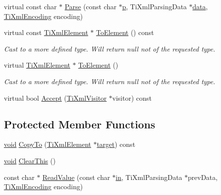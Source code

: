 \begin{DoxyCompactItemize}
\item 
virtual const char $\ast$ \hyperlink{class_ti_xml_element_a697f51bbfff55b7e371c20278087c223}{Parse} (const char $\ast$\hyperlink{glew_8h_aa5367c14d90f462230c2611b81b41d23}{p}, Ti\-Xml\-Parsing\-Data $\ast$\hyperlink{fmod__codec_8h_a42c2b1d86fa71a425e73a882cb0a72c8}{data}, \hyperlink{tinyxml_8h_a88d51847a13ee0f4b4d320d03d2c4d96}{Ti\-Xml\-Encoding} encoding)
\item 
virtual const \hyperlink{class_ti_xml_element}{Ti\-Xml\-Element} $\ast$ \hyperlink{class_ti_xml_element_ac5b8d0e25fa23fd9acbb6d146082901c}{To\-Element} () const 
\begin{DoxyCompactList}\small\item\em Cast to a more defined type. Will return null not of the requested type. \end{DoxyCompactList}\item 
virtual \hyperlink{class_ti_xml_element}{Ti\-Xml\-Element} $\ast$ \hyperlink{class_ti_xml_element_a9def86337ea7a755eb41cac980f60c7a}{To\-Element} ()
\begin{DoxyCompactList}\small\item\em Cast to a more defined type. Will return null not of the requested type. \end{DoxyCompactList}\item 
virtual bool \hyperlink{class_ti_xml_element_a71a81b2afb0d42be1543d1c404dee6f5}{Accept} (\hyperlink{class_ti_xml_visitor}{Ti\-Xml\-Visitor} $\ast$visitor) const 
\end{DoxyCompactItemize}
\subsection*{Protected Member Functions}
\begin{DoxyCompactItemize}
\item 
\hyperlink{wglew_8h_aeea6e3dfae3acf232096f57d2d57f084}{void} \hyperlink{class_ti_xml_element_a9e0c1983b840de4134f1f6bf7af00b0f}{Copy\-To} (\hyperlink{class_ti_xml_element}{Ti\-Xml\-Element} $\ast$\hyperlink{glew_8h_aa43eab0fe80422366a4602998d53b133}{target}) const 
\item 
\hyperlink{wglew_8h_aeea6e3dfae3acf232096f57d2d57f084}{void} \hyperlink{class_ti_xml_element_a5670933ec2d7d9763b9891acc05d7f7d}{Clear\-This} ()
\item 
const char $\ast$ \hyperlink{class_ti_xml_element_ad072ea0e78226a52f0a3872fa03bc29c}{Read\-Value} (const char $\ast$\hyperlink{glew_8h_a83ad0ee7f1e06b59c90271716e689080}{in}, Ti\-Xml\-Parsing\-Data $\ast$prev\-Data, \hyperlink{tinyxml_8h_a88d51847a13ee0f4b4d320d03d2c4d96}{Ti\-Xml\-Encoding} encoding)
\end{DoxyCompactItemize}
